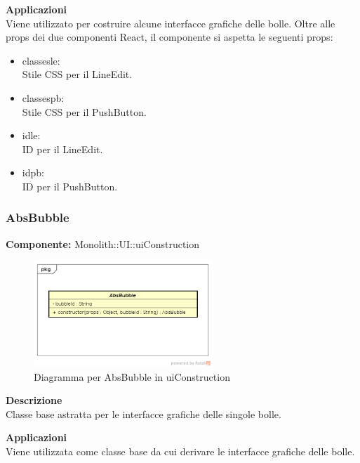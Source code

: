 \textbf{Applicazioni}\\
Viene utilizzato per costruire alcune interfacce grafiche delle bolle.
Oltre alle props dei due componenti React, il componente si aspetta le seguenti props:
\begin{itemize}

\item classesle:
\\
Stile CSS per il LineEdit.
\item classespb:
\\ 
Stile CSS per il PushButton.

\item idle:
\\
ID per il LineEdit.
\item idpb: 
\\
ID per il PushButton.
\end{itemize} 


\clearpage

\subsubsection{AbsBubble}
\textbf{Componente:}  Monolith::UI::uiConstruction\\
   \FloatBarrier
   \begin{figure}[ht]
   \centering
   \includegraphics[width=0.6\textwidth]{img/single-AbsBubble}
   \caption{{Diagramma per AbsBubble in uiConstruction}}
\end{figure}
\FloatBarrier
\textbf{Descrizione}\\
Classe base astratta per le interfacce grafiche delle singole bolle. 


\textbf{Applicazioni}\\
Viene utilizzata come classe base da cui derivare le interfacce grafiche delle bolle. 


\clearpage

